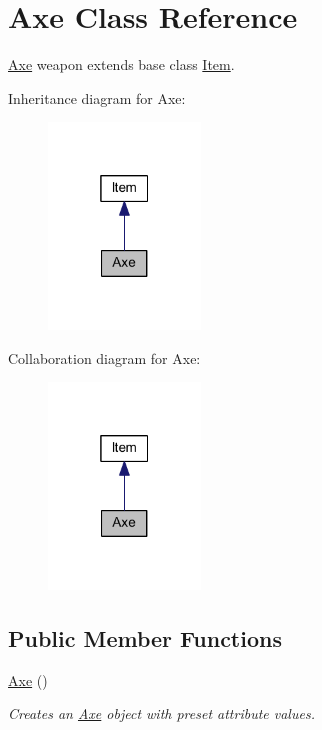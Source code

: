 \hypertarget{class_axe}{}\section{Axe Class Reference}
\label{class_axe}


\mbox{\hyperlink{class_axe}{Axe}} weapon extends base class \mbox{\hyperlink{class_item}{Item}}.  




Inheritance diagram for Axe\+:\nopagebreak
\begin{figure}[H]
\begin{center}
\leavevmode
\includegraphics[width=115pt]{class_axe__inherit__graph}
\end{center}
\end{figure}


Collaboration diagram for Axe\+:\nopagebreak
\begin{figure}[H]
\begin{center}
\leavevmode
\includegraphics[width=115pt]{class_axe__coll__graph}
\end{center}
\end{figure}
\subsection*{Public Member Functions}
\begin{DoxyCompactItemize}
\item 
\mbox{\hyperlink{class_axe_aed1d9071bca40ee8d7ecf73245a7f692}{Axe}} ()
\begin{DoxyCompactList}\small\item\em Creates an \mbox{\hyperlink{class_axe}{Axe}} object with preset attribute values. \end{DoxyCompactList}\end{DoxyCompactItemize}


